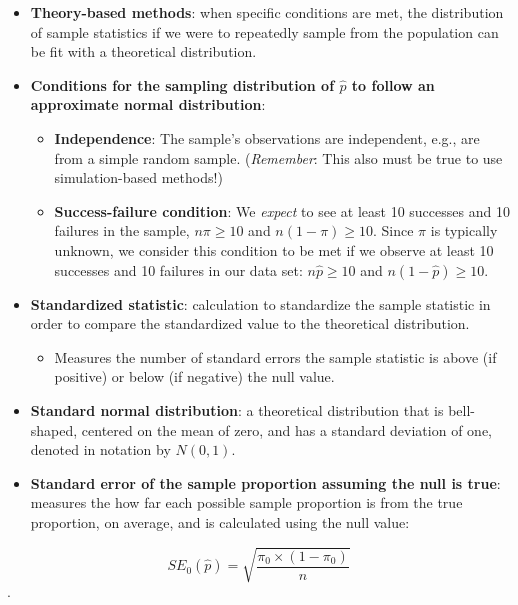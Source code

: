 \documentclass[
]{report}
\providecommand{\tightlist}{%
  \setlength{\itemsep}{0pt}\setlength{\parskip}{0pt}}
\begin{document}
\begin{itemize}
\item
  \textbf{Theory-based methods}: when specific conditions are met, the distribution of sample statistics if we were to repeatedly sample from the population can be fit with a theoretical distribution.
\item
  \textbf{Conditions for the sampling distribution of \(\hat{p}\) to follow an approximate normal distribution}:

  \begin{itemize}
  \item
    \textbf{Independence}: The sample's observations are independent, e.g., are from a simple random sample. (\emph{Remember}: This also must be true to use simulation-based methods!)
  \item
    \textbf{Success-failure condition}: We \emph{expect} to see at least 10 successes and 10 failures in the sample, \(n\pi\geq10\) and \(n(1-\pi)\geq10\). Since \(\pi\) is typically unknown, we consider this condition to be met if we observe at least 10 successes and 10 failures in our data set: \(n\hat{p}\geq10\) and \(n(1-\hat{p})\geq10\).
  \end{itemize}
\item
  \textbf{Standardized statistic}: calculation to standardize the sample statistic in order to compare the standardized value to the theoretical distribution.

  \begin{itemize}
  \tightlist
  \item
    Measures the number of standard errors the sample statistic is above (if positive) or below (if negative) the null value.
  \end{itemize}
\item
  \textbf{Standard normal distribution}: a theoretical distribution that is bell-shaped, centered on the mean of zero, and has a standard deviation of one, denoted in notation by \(N(0,1)\).
\item
  \textbf{Standard error of the sample proportion assuming the null is true}: measures the how far each possible sample proportion is from the true proportion, on average, and is calculated using the null value:
\end{itemize}

\[SE_0(\hat{p})=\sqrt{\frac{\pi_0\times(1-\pi_0)}{n}}\].
\end{document}
